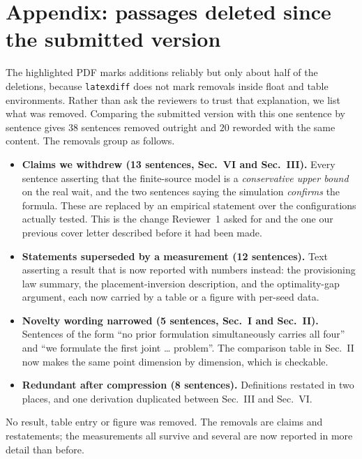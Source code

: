 \documentclass[10pt]{article}
\begin{document}
\section*{Appendix: passages deleted since the submitted version}

The highlighted PDF marks additions reliably but only about half of the deletions, because \texttt{latexdiff} does not mark removals inside float and table environments. Rather than ask the reviewers to trust that explanation, we list what was removed. Comparing the submitted version with this one sentence by sentence gives $38$ sentences removed outright and $20$ reworded with the same content. The removals group as follows.

\begin{itemize}[leftmargin=1.4em]
\item \textbf{Claims we withdrew (13 sentences, Sec.~VI and Sec.~III).} Every sentence asserting that the finite-source model is a \emph{conservative upper bound} on the real wait, and the two sentences saying the simulation \emph{confirms} the formula. These are replaced by an empirical statement over the configurations actually tested. This is the change Reviewer~1 asked for and the one our previous cover letter described before it had been made.
\item \textbf{Statements superseded by a measurement (12 sentences).} Text asserting a result that is now reported with numbers instead: the provisioning law summary, the placement-inversion description, and the optimality-gap argument, each now carried by a table or a figure with per-seed data.
\item \textbf{Novelty wording narrowed (5 sentences, Sec.~I and Sec.~II).} Sentences of the form ``no prior formulation simultaneously carries all four'' and ``we formulate the first joint \dots{} problem''. The comparison table in Sec.~II now makes the same point dimension by dimension, which is checkable.
\item \textbf{Redundant after compression (8 sentences).} Definitions restated in two places, and one derivation duplicated between Sec.~III and Sec.~VI.
\end{itemize}

No result, table entry or figure was removed. The removals are claims and restatements; the measurements all survive and several are now reported in more detail than before.
\end{document}
